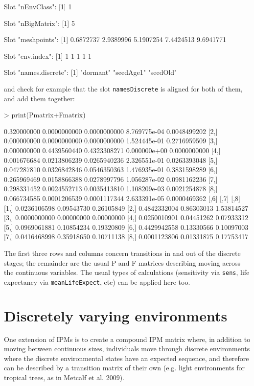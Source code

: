 \documentclass{article}
\begin{document}
\begin{Schunk}
\begin{Soutput}
Slot "nEnvClass":
[1] 1

Slot "nBigMatrix":
[1] 5

Slot "meshpoints":
[1] 0.6872737 2.9389996 5.1907254 7.4424513 9.6941771

Slot "env.index":
[1] 1 1 1 1 1

Slot "names.discrete":
[1] "dormant"  "seedAge1" "seedOld" 
\end{Soutput}
\end{Schunk}
and check for example that the slot {\tt namesDiscrete} is aligned for both of them, and add
them together:
\begin{Schunk}
\begin{Sinput}
> print(Pmatrix+Fmatrix)
\end{Sinput}
\begin{Soutput}
            [,1]         [,2]         [,3]         [,4]         [,5]
[1,] 0.320000000 0.0000000000 0.0000000000 8.769775e-04 0.0048499202
[2,] 0.000000000 0.0000000000 0.0000000000 1.524445e-01 0.2716959509
[3,] 0.000000000 0.4439560440 0.4323308271 0.000000e+00 0.0000000000
[4,] 0.001676684 0.0213806239 0.0265940236 2.326551e-01 0.0263393048
[5,] 0.047287810 0.0326842846 0.0546350363 1.476935e-01 0.3831598289
[6,] 0.265969469 0.0158866388 0.0278997796 1.056287e-02 0.0981162236
[7,] 0.298331452 0.0024552713 0.0035413810 1.108209e-03 0.0021254878
[8,] 0.066734585 0.0001206539 0.0001117344 2.633391e-05 0.0000469362
             [,6]       [,7]       [,8]
[1,] 0.0236106598 0.09543730 0.26105849
[2,] 0.4842332004 0.86303013 1.53814527
[3,] 0.0000000000 0.00000000 0.00000000
[4,] 0.0250010901 0.04451262 0.07933312
[5,] 0.0969061881 0.10854234 0.19320809
[6,] 0.4429942558 0.13330566 0.10097003
[7,] 0.0416468998 0.35918650 0.10711138
[8,] 0.0001123806 0.01331875 0.17753417
\end{Soutput}
\end{Schunk}
The first three rows and columns concern transitions in and out of the discrete stages; the remainder are the usual P and F matrices describing moving across the continuous variables. The usual types of calculations (sensitivity via {\tt sens}, life expectancy via {\tt meanLifeExpect}, etc) can be applied here too.    

\section{Discretely varying environments}
One extension of IPMs is to create a compound IPM matrix where, in addition to
moving between continuous sizes, individuals move through discrete environments where the discrete environmental states have an expected sequence, and therefore can be described by a transition matrix of their own (e.g. light environments for tropical trees, as in Metcalf et al. $2009$).
\end{document}
